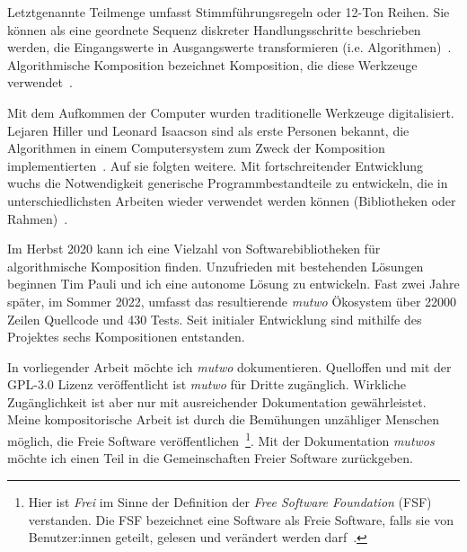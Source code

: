 \documentclass[12pt,a4paper,ngerman]{article}
\begin{document}
\bigskip

\noindent
Letztgenannte Teilmenge umfasst Stimmführungsregeln oder 12-Ton Reihen.
Sie können als eine geordnete Sequenz diskreter Handlungsschritte beschrieben werden, die Eingangswerte in Ausgangswerte transformieren (i.e. Algorithmen)~\parencite[S. 3]{introductionToAlgorithms}.
Algorithmische Komposition bezeichnet Komposition, die diese Werkzeuge verwendet~\parencite[S. 1]{algorithmicCompositionParadigms}.

\bigskip

\noindent
Mit dem Aufkommen der Computer wurden traditionelle Werkzeuge digitalisiert.
Lejaren Hiller und Leonard Isaacson sind als erste Personen bekannt, die Algorithmen in einem Computersystem zum Zweck der Komposition implementierten~\parencite[S. 63]{algorithmicCompositionParadigms}.
Auf sie folgten weitere.
Mit fortschreitender Entwicklung wuchs die Notwendigkeit generische Programmbestandteile zu entwickeln, die in unterschiedlichsten Arbeiten wieder verwendet werden können (Bibliotheken oder Rahmen)~\parencite[S. 78]{paradigmsAndComputerMusic}.

\bigskip

\noindent
Im Herbst 2020 kann ich eine Vielzahl von Softwarebibliotheken für algorithmische Komposition finden.
Unzufrieden mit bestehenden Lösungen beginnen Tim Pauli und ich eine autonome Lösung zu entwickeln.
Fast zwei Jahre später, im Sommer 2022, umfasst das resultierende \emph{mutwo} Ökosystem über 22000 Zeilen Quellcode und 430 Tests.
Seit initialer Entwicklung sind mithilfe des Projektes sechs Kompositionen entstanden.

\bigskip

\noindent
In vorliegender Arbeit möchte ich \emph{mutwo} dokumentieren.
Quelloffen und mit der GPL-3.0 Lizenz veröffentlicht ist \emph{mutwo} für Dritte zugänglich.
Wirkliche Zugänglichkeit ist aber nur mit ausreichender Dokumentation gewährleistet.
Meine kompositorische Arbeit ist durch die Bemühungen unzähliger Menschen möglich, die Freie Software veröffentlichen~\footnote{Hier ist \emph{Frei} im Sinne der Definition der \emph{Free Software Foundation} (FSF) verstanden. Die FSF bezeichnet eine Software als Freie Software, falls sie von Benutzer:innen geteilt, gelesen und verändert werden darf~\parencite{freeSoftwareDefinition}.}.
Mit der Dokumentation \emph{mutwos} möchte ich einen Teil in die Gemeinschaften Freier Software zurückgeben.
\end{document}
